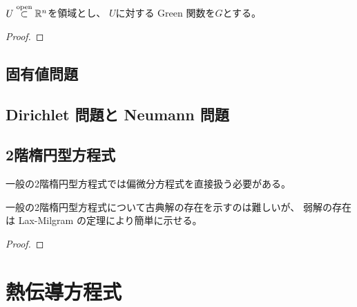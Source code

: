 \documentclass[report]{jlreq}
\begin{document}
\begin{theorem}
    $U \stackrel{\text{open}}{\subset} \mathbb{R}^n$を領域とし、
    $U$に対する Green 関数を$G$とする。
    \TODO{}
\end{theorem}

\begin{proof}
    \TODO{}
\end{proof}

%
\section{固有値問題}

%
\section{Dirichlet 問題と Neumann 問題}

%
\section{2階楕円型方程式}

一般の2階楕円型方程式では偏微分方程式を直接扱う必要がある。

\begin{definition}[弱解]
    \TODO{}
\end{definition}

一般の2階楕円型方程式について古典解の存在を示すのは難しいが、
弱解の存在は Lax-Milgram の定理により簡単に示せる。

\begin{theorem}
    \TODO{}
\end{theorem}

\begin{proof}
    \TODO{}
\end{proof}


%
\chapter{熱伝導方程式}
\end{document}
